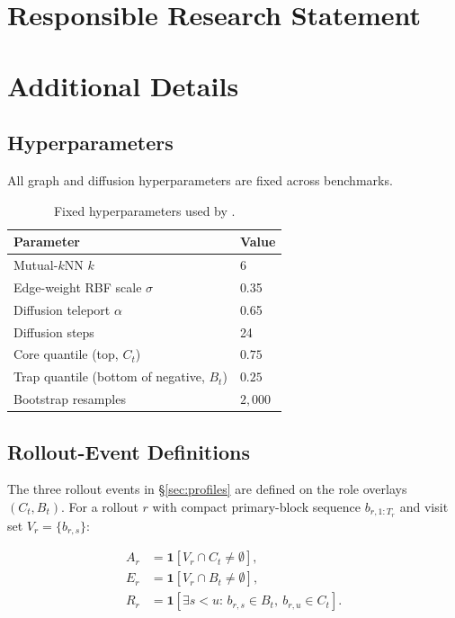 \section{Responsible Research Statement}
\label{app:responsible_research}


\section{Additional \method{} Details}
\label{app:details}

\subsection{Hyperparameters}
All graph and diffusion hyperparameters are fixed across benchmarks.

\begin{table}[h]
\centering
\small
\setlength{\tabcolsep}{5pt}
\begin{tabular}{ll}
\toprule
\textbf{Parameter} & \textbf{Value} \\
\midrule
Mutual-$k$NN $k$ & 6 \\
Edge-weight RBF scale $\sigma$ & 0.35 \\
Diffusion teleport $\alpha$ & 0.65 \\
Diffusion steps & 24 \\
Core quantile (top, $C_t$) & $0.75$ \\
Trap quantile (bottom of negative, $B_t$) & $0.25$ \\
Bootstrap resamples & $2{,}000$ \\
\bottomrule
\end{tabular}
\caption{Fixed hyperparameters used by \method{}.}
\label{tab:hyperparams_full}
\end{table}

\subsection{Rollout-Event Definitions}
\label{app:rollout_events}

The three rollout events in \S\ref{sec:profiles} are defined on the role overlays $(C_t,B_t)$.
For a rollout $r$ with compact primary-block sequence $b_{r,1:T_r}$ and visit set $V_r=\{b_{r,s}\}$:

\begin{align}
A_r &= \mathbf{1}[V_r\cap C_t\neq\emptyset], \label{eq:Ar}\\
E_r &= \mathbf{1}[V_r\cap B_t\neq\emptyset], \label{eq:Er}\\
R_r &= \mathbf{1}[\exists s<u:\, b_{r,s}\in B_t,\ b_{r,u}\in C_t]. \label{eq:Rr}
\end{align}

